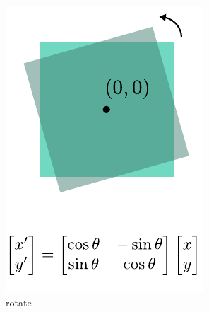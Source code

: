 \begin{figure}[t]
\begin{subfigure}[t]{0.195\linewidth}
        \includegraphics[width=\linewidth]{imgs/rotate.pdf}
        \caption{\label{fig:rotate} rotate}
    \end{subfigure}
    \begin{subfigure}[t]{0.195\linewidth}
        \centering

\end{subfigure}
\end{figure}
